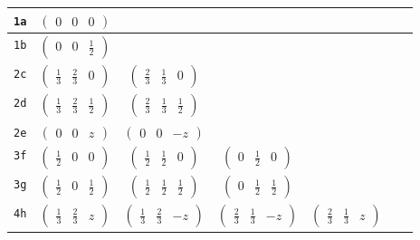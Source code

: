 \documentclass[fleqn,9pt,landscape]{jsarticle}
\begin{document}
\begin{center}
\begin{longtable}{ccccccc}
{\tt 1a} & $ \begin{pmatrix} 0 & 0 & 0 \end{pmatrix} $ & $  $ & $  $ & $  $ & $  $ & $  $ \\ \hline
{\tt 1b} & $ \begin{pmatrix} 0 & 0 & \frac{1}{2} \end{pmatrix} $ & $  $ & $  $ & $  $ & $  $ & $  $ \\ \hline
{\tt 2c} & $ \begin{pmatrix} \frac{1}{3} & \frac{2}{3} & 0 \end{pmatrix} $ & $ \begin{pmatrix} \frac{2}{3} & \frac{1}{3} & 0 \end{pmatrix} $ & $  $ & $  $ & $  $ & $  $ \\ \hline
{\tt 2d} & $ \begin{pmatrix} \frac{1}{3} & \frac{2}{3} & \frac{1}{2} \end{pmatrix} $ & $ \begin{pmatrix} \frac{2}{3} & \frac{1}{3} & \frac{1}{2} \end{pmatrix} $ & $  $ & $  $ & $  $ & $  $ \\ \hline
{\tt 2e} & $ \begin{pmatrix} 0 & 0 & z \end{pmatrix} $ & $ \begin{pmatrix} 0 & 0 & - z \end{pmatrix} $ & $  $ & $  $ & $  $ & $  $ \\ \hline
{\tt 3f} & $ \begin{pmatrix} \frac{1}{2} & 0 & 0 \end{pmatrix} $ & $ \begin{pmatrix} \frac{1}{2} & \frac{1}{2} & 0 \end{pmatrix} $ & $ \begin{pmatrix} 0 & \frac{1}{2} & 0 \end{pmatrix} $ & $  $ & $  $ & $  $ \\ \hline
{\tt 3g} & $ \begin{pmatrix} \frac{1}{2} & 0 & \frac{1}{2} \end{pmatrix} $ & $ \begin{pmatrix} \frac{1}{2} & \frac{1}{2} & \frac{1}{2} \end{pmatrix} $ & $ \begin{pmatrix} 0 & \frac{1}{2} & \frac{1}{2} \end{pmatrix} $ & $  $ & $  $ & $  $ \\ \hline
{\tt 4h} & $ \begin{pmatrix} \frac{1}{3} & \frac{2}{3} & z \end{pmatrix} $ & $ \begin{pmatrix} \frac{1}{3} & \frac{2}{3} & - z \end{pmatrix} $ & $ \begin{pmatrix} \frac{2}{3} & \frac{1}{3} & - z \end{pmatrix} $ & $ \begin{pmatrix} \frac{2}{3} & \frac{1}{3} & z \end{pmatrix} $ & $  $ & $  $ \\ \hline

\end{longtable}
\end{center}
\end{document}
